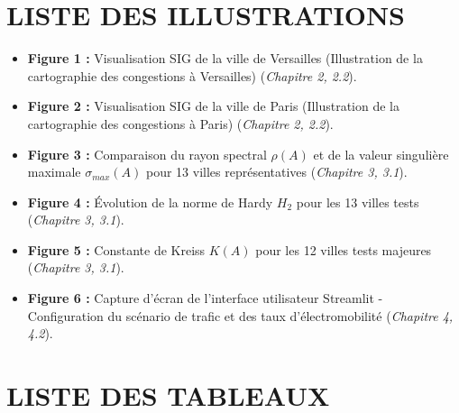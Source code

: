 \documentclass[10pt, a4paper]{article}
\providecommand{\tightlist}{}
\begin{document}
\newpage

\section{LISTE DES ILLUSTRATIONS}\label{liste-des-illustrations}

\begin{itemize}
\tightlist
\item
  \textbf{Figure 1 :} Visualisation SIG de la ville de Versailles
  (Illustration de la cartographie des congestions à Versailles)
  (\emph{Chapitre 2, 2.2}).
\item
  \textbf{Figure 2 :} Visualisation SIG de la ville de Paris
  (Illustration de la cartographie des congestions à Paris)
  (\emph{Chapitre 2, 2.2}).
\item
  \textbf{Figure 3 :} Comparaison du rayon spectral \(\rho(A)\) et de la
  valeur singulière maximale \(\sigma_{max}(A)\) pour 13 villes
  représentatives (\emph{Chapitre 3, 3.1}).
\item
  \textbf{Figure 4 :} Évolution de la norme de Hardy \(H_2\) pour les 13
  villes tests (\emph{Chapitre 3, 3.1}).
\item
  \textbf{Figure 5 :} Constante de Kreiss \(K(A)\) pour les 12 villes
  tests majeures (\emph{Chapitre 3, 3.1}).
\item
  \textbf{Figure 6 :} Capture d'écran de l'interface utilisateur
  Streamlit - Configuration du scénario de trafic et des taux
  d'électromobilité (\emph{Chapitre 4, 4.2}).
\end{itemize}

\newpage

\section{LISTE DES TABLEAUX}\label{liste-des-tableaux}
\end{document}

